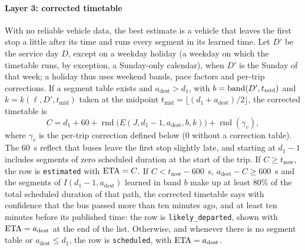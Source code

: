 \paragraph{Layer 3: corrected timetable} With no reliable vehicle data, the best estimate is a vehicle that leaves the
first stop a little after its time and runs every segment in its learned time. Let $D'$ be the service day $D$, except
on a weekday holiday (a weekday on which the timetable runs, by exception, a Sunday-only calendar), when $D'$ is the
Sunday of that week; a holiday thus uses weekend bands, pace factors and per-trip corrections. If a segment table
exists and $a_{\mathrm{dest}}>d_1$, with $b=\operatorname{band}(D',t_{\mathrm{mid}})$ and $k=k(\ell,D',t_{\mathrm{mid}})$ taken at
the midpoint $t_{\mathrm{mid}}=\lfloor(d_1+a_{\mathrm{dest}})/2\rfloor$, the corrected timetable is
\begin{equation}
C=d_1+60+\operatorname{rnd}\big(E(J,d_1-1,a_{\mathrm{dest}},b,k)\big)+\operatorname{rnd}(\gamma_v),
\label{eq:layer3}
\end{equation}
where $\gamma_v$ is the per-trip correction defined below (0 without a correction table). The 60~s reflect that buses
leave the first stop slightly late, and starting at $d_1-1$ includes segments of zero scheduled duration at the start
of the trip. If $C\ge t_{\mathrm{now}}$, the row is \texttt{estimated} with $\mathrm{ETA}=C$. If $C<t_{\mathrm{now}}-600$~s,
$a_{\mathrm{dest}}-C\ge600$~s and the segments of $I(d_1-1,a_{\mathrm{dest}})$ learned in band $b$ make up at least
80\% of the total scheduled duration of that path, the corrected timetable says with confidence that the bus passed
more than ten minutes ago, and at least ten minutes before its published time: the row is \texttt{likely\_departed},
shown with $\mathrm{ETA}=a_{\mathrm{dest}}$ at the end of the list. Otherwise, and whenever there is no segment table or
$a_{\mathrm{dest}}\le d_1$, the row is \texttt{scheduled}, with $\mathrm{ETA}=a_{\mathrm{dest}}$.

